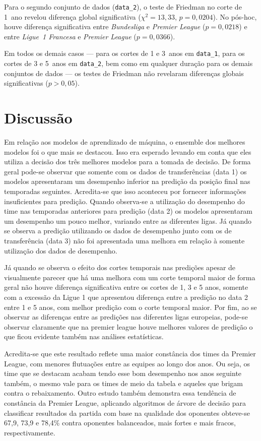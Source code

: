 \documentclass[a4paper]{article}
\theoremstyle{plain}
\theoremstyle{definition}
\begin{document}
Para o segundo conjunto de dados (\texttt{data\_2}), o teste de Friedman no corte de 1~ano revelou diferença global significativa ($\chi^{2}=13{,}33$, $p=0{,}0204$). No pós-hoc, houve diferença significativa entre \textit{Bundesliga} e \textit{Premier League} ($p=0{,}0218$) e entre \textit{Ligue 1 Francesa} e \textit{Premier League} ($p=0{,}0366$).

Em todos os demais casos — para os cortes de 1 e 3~anos em \texttt{data\_1}, para os cortes de 3 e 5~anos em \texttt{data\_2}, bem como em qualquer duração para os demais conjuntos de dados — os testes de Friedman não revelaram diferenças globais significativas ($p>0{,}05$).




\section{Discussão}
    
Em relação aos modelos de aprendizado de máquina, o ensemble dos melhores modelos foi o que mais se destacou. Isso era esperado levando em conta que eles utiliza a decisão dos três melhores modelos para a tomada de decisão. De forma geral pode-se observar que somente com os dados de transferências (data 1) os modelos apresentaram um desempenho inferior na predição da posição final nas temporadas seguintes. Acredita-se que isso aconteceu por fornecer informações insuficientes para predição. Quando observa-se a utilização do desempenho do time nas temporadas anteriores para predição (data 2) os modelos apresentaram um desempenho um pouco melhor, variando entre as diferentes ligas. Já quando se observa a predição utilizando os dados de desempenho junto com os de transferência (data 3) não foi apresentada uma melhora em relação à somente utilização dos dados de desempenho. 

Já quando se observa o efeito dos cortes temporais nas predições apesar de visualmente parecer que há uma melhora com um corte temporal maior de forma geral não houve diferença significativa entre os cortes de 1, 3 e 5 anos, somente com a excessão da Ligue 1 que apresentou diferença entre a predição no data 2 entre 1 e 5 anos, com melhor predição com o corte temporal maior. Por fim, ao se observar as diferenças entre as predições nas diferentes ligas europeias, pode-se observar claramente que na premier league houve melhores valores de predição o que ficou evidente também nas análises estatísticas.

Acredita-se que este resultado reflete uma maior constância dos times da Premier League, com menores flutuações entre as equipes ao longo dos anos. Ou seja, os time que se destacam acabam tendo esse bom desempenho nos anos seguinte também, o mesmo vale para os times de meio da tabela e aqueles que brigam contra o rebaixamento. Outro estudo também demonstra essa tendência de constância da Premier League, aplicando algoritmos de árvore de decisão para classificar resultados da partida com base na qualidade dos oponentes obteve-se 67,9, 73,9 e 78,4\%  contra oponentes balanceados, mais fortes e mais fracos, respectivamente\cite{bilek2019predicting}.
\end{document}
